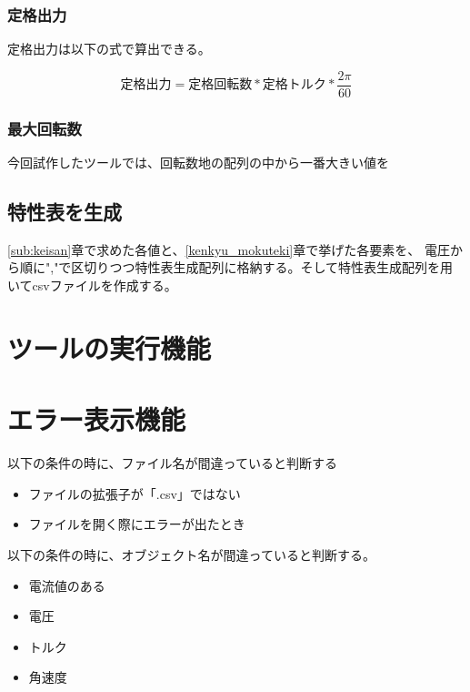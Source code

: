 
\subsubsection{定格出力}\label{sub:keisan_teikakusyutu}
定格出力は以下の式で算出できる。

\[
    \mbox{定格出力} = \mbox{定格回転数} * \mbox{定格トルク} *  \frac{2\pi}{60}
\]

\subsubsection{最大回転数}\label{sub:keisan_saidaikai}
今回試作したツールでは、回転数地の配列の中から一番大きい値を

\subsection{特性表を生成}\label{seisei_hyou}
\ref{sub:keisan}章で求めた各値と、\ref{kenkyu_mokuteki}章で挙げた各要素を、
電圧から順に","で区切りつつ特性表生成配列に格納する。そして特性表生成配列を用いてcsvファイルを作成する。

\section{ツールの実行機能}\label{zikkoukinou}


\section{エラー表示機能}\label{errorkinou}

以下の条件の時に、ファイル名が間違っていると判断する
\begin{itemize}
    \item ファイルの拡張子が「.csv」ではない
    \item ファイルを開く際にエラーが出たとき
\end{itemize}

以下の条件の時に、オブジェクト名が間違っていると判断する。
\begin{itemize}
    \item 電流値のある
    \item 電圧
    \item トルク
    \item 角速度
\end{itemize}